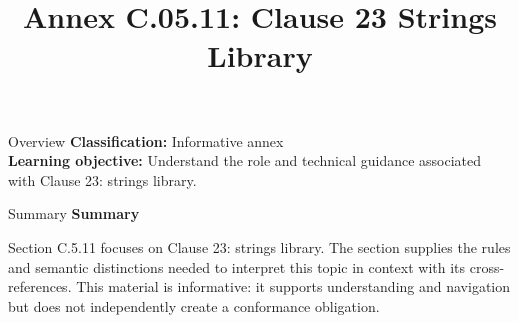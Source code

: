 \documentclass[10pt,letterpaper]{article}
\title{Annex C.05.11: Clause 23 Strings Library}
\author{}
\date{}
\begin{document}
\maketitle
\begin{CornellOverviewBox}{Overview}
\textbf{Classification:} Informative annex\\[2pt]
\textbf{Learning objective:} Understand the role and technical guidance associated with Clause 23: strings library.
\end{CornellOverviewBox}\begin{CornellSummaryBox}{Summary}
{\sffamily\bfseries\color{Accent} Summary}\par\vspace{3pt}Section C.5.11 focuses on Clause 23: strings library. The section supplies the rules and semantic distinctions needed to interpret this topic in context with its cross-references. This material is informative: it supports understanding and navigation but does not independently create a conformance obligation.
\end{CornellSummaryBox}
\end{document}
